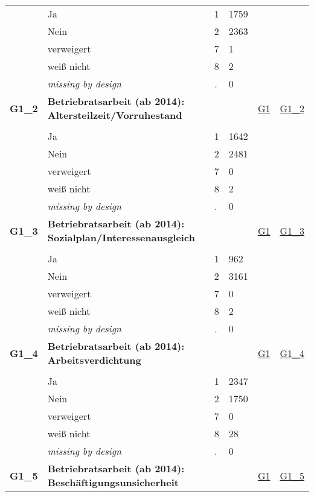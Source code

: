 \begin{longtable}{| L{2.45cm} | L{6cm} | C{1.5cm} | R{1cm} | C{2.25cm} | C{2.25cm} |}
   & Ja & 1 & 1759 &  &  \\ 
   & Nein & 2 & 2363 &  &  \\ 
   & verweigert & 7 & 1 &  &  \\ 
   & weiß nicht & 8 & 2 &  &  \\ 
   & \textit{missing by design} & \textit{.} & 0 &  &  \\ 
   \midrule
\textbf{G1\_2}\label{var:G1:2} & \textbf{Betriebratsarbeit (ab 2014): Altersteilzeit/Vorruhestand} &  &  & \hyperref[G1]{G1} & \hyperref[var:suf:G1:2]{G1\_2} \\ 
   &  &  &  &  &  \\ 
   & Ja & 1 & 1642 &  &  \\ 
   & Nein & 2 & 2481 &  &  \\ 
   & verweigert & 7 & 0 &  &  \\ 
   & weiß nicht & 8 & 2 &  &  \\ 
   & \textit{missing by design} & \textit{.} & 0 &  &  \\ 
   \midrule
\textbf{G1\_3}\label{var:G1:3} & \textbf{Betriebratsarbeit (ab 2014): Sozialplan/Interessenausgleich} &  &  & \hyperref[G1]{G1} & \hyperref[var:suf:G1:3]{G1\_3} \\ 
   &  &  &  &  &  \\ 
   & Ja & 1 & 962 &  &  \\ 
   & Nein & 2 & 3161 &  &  \\ 
   & verweigert & 7 & 0 &  &  \\ 
   & weiß nicht & 8 & 2 &  &  \\ 
   & \textit{missing by design} & \textit{.} & 0 &  &  \\ 
   \midrule
\textbf{G1\_4}\label{var:G1:4} & \textbf{Betriebratsarbeit (ab 2014): Arbeitsverdichtung} &  &  & \hyperref[G1]{G1} & \hyperref[var:suf:G1:4]{G1\_4} \\ 
   &  &  &  &  &  \\ 
   & Ja & 1 & 2347 &  &  \\ 
   & Nein & 2 & 1750 &  &  \\ 
   & verweigert & 7 & 0 &  &  \\ 
   & weiß nicht & 8 & 28 &  &  \\ 
   & \textit{missing by design} & \textit{.} & 0 &  &  \\ 
   \midrule
\textbf{G1\_5}\label{var:G1:5} & \textbf{Betriebratsarbeit (ab 2014): Beschäftigungsunsicherheit} &  &  & \hyperref[G1]{G1} & \hyperref[var:suf:G1:5]{G1\_5} \\ 

\end{longtable}
